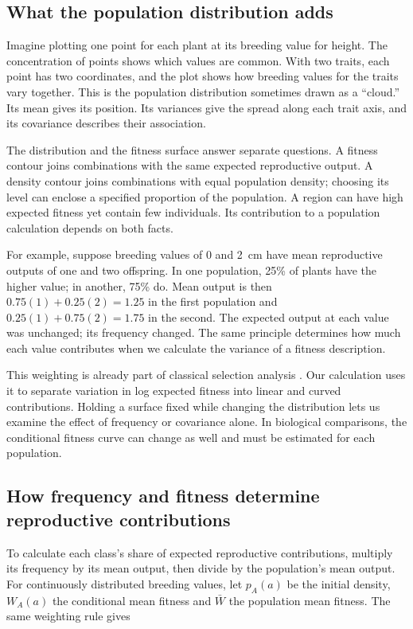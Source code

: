 \documentclass[11pt]{article}
\newcounter{answer}
\begin{document}
\subsection{What the population distribution adds}

Imagine plotting one point for each plant at its breeding value for height. The concentration of points shows which values are common. With two traits, each point has two coordinates, and the plot shows how breeding values for the traits vary together. This is the population distribution sometimes drawn as a ``cloud.'' Its mean gives its position. Its variances give the spread along each trait axis, and its covariance describes their association.

The distribution and the fitness surface answer separate questions. A fitness contour joins combinations with the same expected reproductive output. A density contour joins combinations with equal population density; choosing its level can enclose a specified proportion of the population. A region can have high expected fitness yet contain few individuals. Its contribution to a population calculation depends on both facts.

For example, suppose breeding values of 0 and 2~cm have mean reproductive outputs of one and two offspring. In one population, 25\% of plants have the higher value; in another, 75\% do. Mean output is then $0.75(1)+0.25(2)=1.25$ in the first population and $0.25(1)+0.75(2)=1.75$ in the second. The expected output at each value was unchanged; its frequency changed. The same principle determines how much each value contributes when we calculate the variance of a fitness description.

This weighting is already part of classical selection analysis \citep{LandeArnold1983}. Our calculation uses it to separate variation in log expected fitness into linear and curved contributions. Holding a surface fixed while changing the distribution lets us examine the effect of frequency or covariance alone. In biological comparisons, the conditional fitness curve can change as well and must be estimated for each population.

\subsection{How frequency and fitness determine reproductive contributions}

To calculate each class's share of expected reproductive contributions, multiply its frequency by its mean output, then divide by the population's mean output. For continuously distributed breeding values, let $p_A(a)$ be the initial density, $W_A(a)$ the conditional mean fitness and $\bar W$ the population mean fitness. The same weighting rule gives
\end{document}
